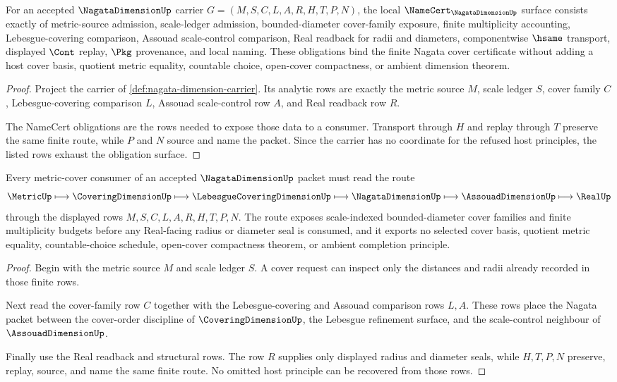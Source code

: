 \begin{theorem}
\label{thm:nagata-dimension-namecert-obligations}
For an accepted $\NagataDimensionUp$ carrier $G=(M,S,C,L,A,R,H,T,P,N)$, the local $\NameCert_{\NagataDimensionUp}$ surface consists exactly of metric-source admission, scale-ledger admission, bounded-diameter cover-family exposure, finite multiplicity accounting, Lebesgue-covering comparison, Assouad scale-control comparison, Real readback for radii and diameters, componentwise $\hsame$ transport, displayed $\Cont$ replay, $\Pkg$ provenance, and local naming. These obligations bind the finite Nagata cover certificate without adding a host cover basis, quotient metric equality, countable choice, open-cover compactness, or ambient dimension theorem.
\end{theorem}
\begin{proof}
Project the carrier of \autoref{def:nagata-dimension-carrier}. Its analytic rows are exactly the metric source $M$, scale ledger $S$, cover family $C$, Lebesgue-covering comparison $L$, Assouad scale-control row $A$, and Real readback row $R$.

The NameCert obligations are the rows needed to expose those data to a consumer. Transport through $H$ and replay through $T$ preserve the same finite route, while $P$ and $N$ source and name the packet. Since the carrier has no coordinate for the refused host principles, the listed rows exhaust the obligation surface.
\end{proof}

\begin{theorem}
\label{thm:nagata-dimension-metric-cover-route}
Every metric-cover consumer of an accepted $\NagataDimensionUp$ packet must read the route
$$
\MetricUp \longmapsto \CoveringDimensionUp \longmapsto \LebesgueCoveringDimensionUp \longmapsto \NagataDimensionUp \longmapsto \AssouadDimensionUp \longmapsto \RealUp
$$
through the displayed rows $M,S,C,L,A,R,H,T,P,N$. The route exposes scale-indexed bounded-diameter cover families and finite multiplicity budgets before any Real-facing radius or diameter seal is consumed, and it exports no selected cover basis, quotient metric equality, countable-choice schedule, open-cover compactness theorem, or ambient completion principle.
\end{theorem}
\begin{proof}
Begin with the metric source $M$ and scale ledger $S$. A cover request can inspect only the distances and radii already recorded in those finite rows.

Next read the cover-family row $C$ together with the Lebesgue-covering and Assouad comparison rows $L,A$. These rows place the Nagata packet between the cover-order discipline of $\CoveringDimensionUp$, the Lebesgue refinement surface, and the scale-control neighbour of $\AssouadDimensionUp$.

Finally use the Real readback and structural rows. The row $R$ supplies only displayed radius and diameter seals, while $H,T,P,N$ preserve, replay, source, and name the same finite route. No omitted host principle can be recovered from those rows.
\end{proof}

